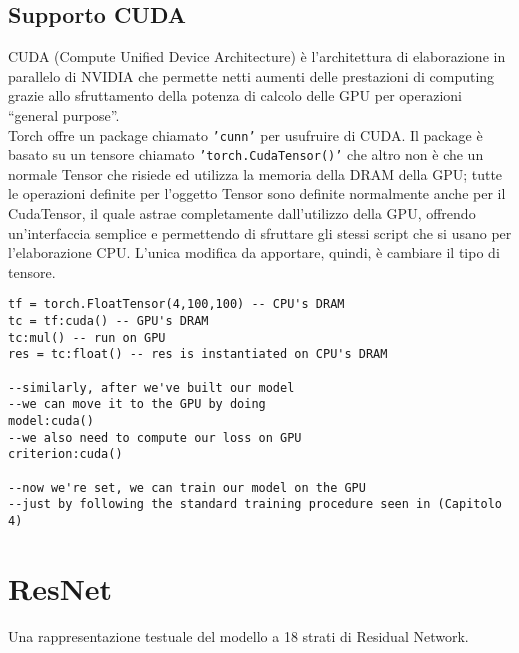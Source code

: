 \subsection{Supporto CUDA}
CUDA (Compute Unified Device Architecture) è l'architettura di elaborazione in parallelo di NVIDIA che permette netti aumenti delle prestazioni di computing grazie allo sfruttamento della potenza di calcolo delle GPU per operazioni “general purpose”.\\
Torch offre un package chiamato \texttt{'cunn'} per usufruire di CUDA. Il package è basato su un tensore chiamato \texttt{'torch.CudaTensor()'} che altro non è che un normale Tensor che risiede ed utilizza la memoria della DRAM della GPU; tutte le operazioni definite per l'oggetto Tensor sono definite normalmente anche per il CudaTensor, il quale astrae completamente dall'utilizzo della GPU, offrendo un'interfaccia semplice e permettendo di sfruttare gli stessi script che si usano per l'elaborazione CPU. L'unica modifica da apportare, quindi, è cambiare il tipo di tensore. 
\begin{lstlisting}[language={[5.2]Lua}]
tf = torch.FloatTensor(4,100,100) -- CPU's DRAM
tc = tf:cuda() -- GPU's DRAM 
tc:mul() -- run on GPU
res = tc:float() -- res is instantiated on CPU's DRAM

--similarly, after we've built our model
--we can move it to the GPU by doing
model:cuda()
--we also need to compute our loss on GPU
criterion:cuda()

--now we're set, we can train our model on the GPU 
--just by following the standard training procedure seen in (Capitolo 4)
\end{lstlisting}


\section{ResNet}
Una rappresentazione testuale del modello a 18 strati di Residual Network. 

